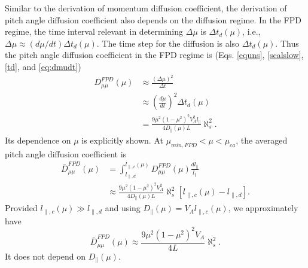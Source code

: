 \documentclass[preprint2,twocolumn,times,tighten]{aastex63}
\begin{document}
{{Similar to the derivation of momentum diffusion coefficient, the derivation of pitch angle diffusion coefficient also depends on the diffusion regime.}
In the FPD regime, the time interval relevant in determining $\Delta \mu$ is $\Delta t_d(\mu)$, i.e.,
$\Delta \mu \approx (d\mu/dt) \Delta t_d(\mu)$. The time step for the diffusion is also $\Delta t_d(\mu)$. Thus the pitch angle diffusion coefficient in the FPD regime is 
(Eqs. \eqref{equns}, \eqref{scalslow}, \eqref{td}, and \eqref{eq:dmudt})
\begin{equation}
\begin{aligned}
    D_{\mu\mu}^{FPD} (\mu)
    &\approx \frac{(\Delta \mu)^2 }{\Delta t} \\
    &\approx \left(\frac{d\mu}{dt}\right)^2 \Delta t_d(\mu) \\
    & = \frac{9 \mu^2(1-\mu^2)^2 V_A^2 l_\|}{4 D_\|(\mu)L}  \aleph_s^2.
    \label{Dmm}
\end{aligned}
\end{equation}
Its dependence on $\mu$ is explicitly shown.
At $\mu_{min,FPD} <\mu<\mu_{ca}$, the averaged pitch angle diffusion coefficient is 
\begin{equation}
\begin{aligned}
   \bar{D}_{\mu\mu}^{FPD}(\mu) 
   &= \int_{l_{\|,d}}^{l_{\|,c}(\mu)}D_{\mu\mu}^{FPD}(\mu) \frac{dl_\|}{l_\|} \\ 
   &\approx  \frac{9 \mu^2(1-\mu^2)^2 V_A^2}{4 D_\|(\mu)L}  \aleph_s^2 [l_{\|,c}(\mu)-l_{\|,d}].
\end{aligned}
\end{equation}
Provided $l_{\|,c}(\mu)\gg l_{\|,d}$ and using $D_{\|}(\mu) = V_A l_{\|,c}(\mu)$, we approximately have 
\begin{equation}\label{eq:appdmmf}
\bar{D}_{\mu\mu}^{FPD}(\mu) \approx 
  \frac{9 \mu^2(1-\mu^2)^2 V_A}{4 L}  \aleph_s^2 .
\end{equation}
{It does not depend on $D_\|(\mu)$.}



}
\end{document}
